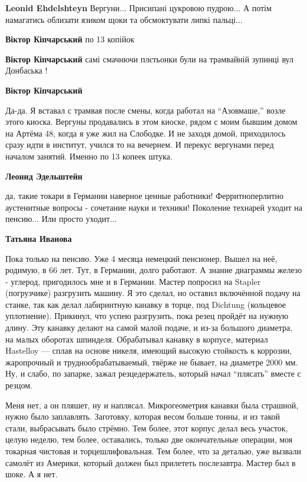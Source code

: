 \begin{itemize} %
\textbf{Leonid Ehdelshteyn} Вергуни... Присипані цукровою пудрою... А потім намагатись облизати язиком щоки та обсмоктувати липкі пальці...

\begin{itemize} %
\textbf{Віктор Кіпчарський} по 13 копійок

\textbf{Віктор Кіпчарський} самі смачнючи плєтьонки були на трамвайній зупинці вул Донбаська !

\textbf{Віктор Кіпчарський} 

Да-да. Я вставал с трамвая после смены, когда работал на \enquote{Азовмаше,} возле
этого киоска. Вергуны продавались в этом киоске, рядом с моим бывшим домом на
Артёма 48, когда я уже жил на Слободке. И не заходя домой, приходилось сразу
идти в институт, учился то на вечернем. И перекус вергунами перед началом
занятий. Именно по 13 копеек штука.

\end{itemize} %

\textbf{Леонид Эдельштейн} 

да, такие токари в Германии наверное ценные работники! Ферритноперлитно
аустенитные вопросы - сочетание науки и техники! Поколение технарей уходит на
пенсию... Или просто уходит...

\begin{itemize} %
\textbf{Татьяна Иванова} 

Пока только на пенсию. Уже 4 месяца немецкий пенсионер. Вышел на неё, родимую,
в 66 лет. Тут, в Германии, долго работают. А знание диаграммы железо - углерод,
пригодилось мне и в Германии. Мастер попросил на Stapler (погрузчике)
разгрузить машину. Я это сделал, но оставил включённой подачу на станке, так
как делал лабиринтную канавку в торце, под Dichtung (кольцевое уплотнение).
Прикинул, что успею разгрузить, пока резец пройдёт на нужную длину. Эту канавку
делают на самой малой подаче, и из-за большого диаметра, на малых оборотах
шпинделя. Обрабатывал канавку в корпусе, материал Hastelloy — сплав на основе
никеля, имеющий высокую стойкость к коррозии, жаропрочный и
труднообрабатываемый, твёрже не бывает, на диаметре 2000 мм. Ну, и слабо, по
запарке, зажал резцедержатель, который начал \enquote{плясать} вместе с резцом.

Меня нет, а он пляшет, ну и наплясал. Микрогеометрия канавки была страшной,
нужно было заплавлять. Заготовку, которая весом больше тонны, и из такой стали,
выбрасывать было стрёмно. Тем более, этот корпус делал весь участок, целую
неделю, тем более, оставались, только две окончательные операции, моя токарная
чистовая и торцешлифовальная. Тем более, что за деталью, уже вызвали самолёт из
Америки, который должен был прилететь послезавтра. Мастер был в шоке. А я нет.


\end{itemize}
\end{itemize}
